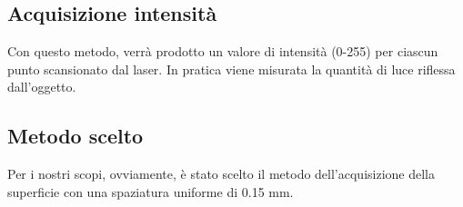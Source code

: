 \subsection{Acquisizione intensità}
Con questo metodo, verrà prodotto un valore di intensità (0-255) per ciascun punto scansionato dal laser. In pratica viene misurata la quantità di luce riflessa dall'oggetto.

\subsection{Metodo scelto}
Per i nostri scopi, ovviamente, è stato scelto il metodo dell'acquisizione della superficie con una spaziatura uniforme di 0.15 mm.